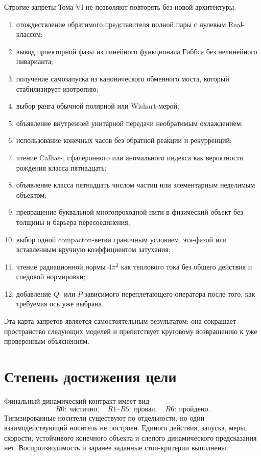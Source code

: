 Строгие запреты Тома VI не позволяют повторять без новой архитектуры:
\begin{enumerate}
 \item отождествление обратимого представителя полной пары с нулевым
 Real-классом;
 \item вывод проекторной фазы из линейного функционала Гиббса без
 нелинейного инварианта;
 \item получение самозапуска из канонического обменного моста, который
 стабилизирует изотропию;
 \item выбор ранга обычной полярной или Wishart-мерой;
 \item объявление внутренней унитарной передачи необратимым охлаждением;
 \item использование конечных часов без обратной реакции и рекурренций;
 \item чтение Callias-, сфалеронного или аномального индекса как
 вероятности рождения класса пятнадцать;
 \item объявление класса пятнадцать числом частиц или элементарным
 неделимым объектом;
 \item превращение буквальной многопроходной нити в физический объект без
 толщины и барьера пересоединения;
 \item выбор одной compacton-ветви граничным условием, эта-фазой или
 вставленным вручную коэффициентом затухания;
 \item чтение радиационной нормы $4\pi^2$ как теплового тока без общего
 действия и следовой нормировки;
 \item добавление $Q$- или $P$-зависимого переплетающего оператора после
 того, как требуемая ось уже выбрана.
\end{enumerate}

Эта карта запретов является самостоятельным результатом: она сокращает
пространство следующих моделей и препятствует круговому возвращению к
уже проверенным объяснениям.

\section{Степень достижения цели}

Финальный динамический контракт имеет вид
\begin{equation}
 \boxed{
 R0:\ \text{частично},\quad
 R1\text{--}R5:\ \text{провал},\quad
 R6:\ \text{пройдено}.}
\end{equation}
Типизированные носители существуют по отдельности, но один
взаимодействующий носитель не построен. Единого действия, запуска, меры,
скорости, устойчивого конечного объекта и слепого динамического
предсказания нет. Воспроизводимость и заранее заданные стоп-критерии
выполнены.

